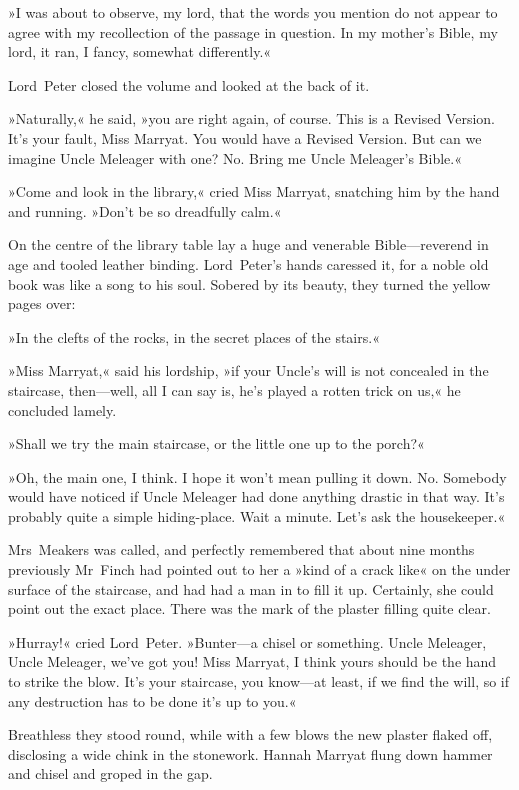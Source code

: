 »I was about to observe, my lord, that the words you mention do not appear to agree with my recollection of the passage in question. In my mother's Bible, my lord, it ran, I fancy, somewhat differently.«

Lord~Peter closed the volume and looked at the back of it.

»Naturally,« he said, »you are right again, of course. This is a Revised Version. It's your fault, Miss Marryat. You would have a Revised Version. But can we imagine Uncle Meleager with one? No. Bring me Uncle Meleager's Bible.«

»Come and look in the library,« cried Miss Marryat, snatching him by the hand and running. »Don't be so dreadfully calm.«

On the centre of the library table lay a huge and venerable Bible—reverend in age and tooled leather binding. Lord~Peter's hands caressed it, for a noble old book was like a song to his soul. Sobered by its beauty, they turned the yellow pages over:

»In the clefts of the rocks, in the secret places of the stairs.«

»Miss Marryat,« said his lordship, »if your Uncle's will is not concealed in the staircase, then—well, all I can say is, he's played a rotten trick on us,« he concluded lamely.

»Shall we try the main staircase, or the little one up to the porch?«

»Oh, the main one, I think. I hope it won't mean pulling it down. No. Somebody would have noticed if Uncle Meleager had done anything drastic in that way. It's probably quite a simple hiding-place. Wait a minute. Let's ask the housekeeper.«

Mrs~Meakers was called, and perfectly remembered that about nine months previously Mr~Finch had pointed out to her a »kind of a crack like« on the under surface of the staircase, and had had a man in to fill it up. Certainly, she could point out the exact place. There was the mark of the plaster filling quite clear.

»Hurray!« cried Lord~Peter. »Bunter—a chisel or something. Uncle Meleager, Uncle Meleager, we've got you! Miss Marryat, I think yours should be the hand to strike the blow. It's your staircase, you know—at least, if we find the will, so if any destruction has to be done it's up to you.«

Breathless they stood round, while with a few blows the new plaster flaked off, disclosing a wide chink in the stonework. Hannah Marryat flung down hammer and chisel and groped in the gap.

